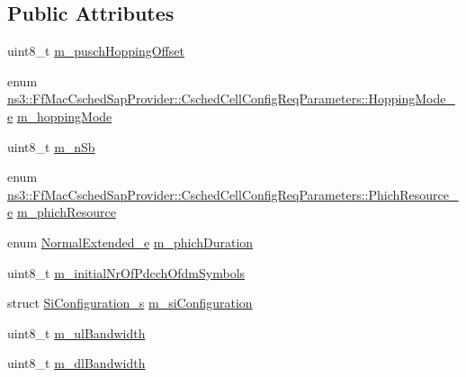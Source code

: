 \subsection*{Public Attributes}
\begin{DoxyCompactItemize}
\item 
uint8\+\_\+t \hyperlink{structns3_1_1FfMacCschedSapProvider_1_1CschedCellConfigReqParameters_a9b2039417a2acae24f34443d4ccca623}{m\+\_\+pusch\+Hopping\+Offset}
\item 
enum \hyperlink{structns3_1_1FfMacCschedSapProvider_1_1CschedCellConfigReqParameters_a3a253470bbd8ba28e90cf09b6c382520}{ns3\+::\+Ff\+Mac\+Csched\+Sap\+Provider\+::\+Csched\+Cell\+Config\+Req\+Parameters\+::\+Hopping\+Mode\+\_\+e} \hyperlink{structns3_1_1FfMacCschedSapProvider_1_1CschedCellConfigReqParameters_aad101ab154fed558ad95118b238e312c}{m\+\_\+hopping\+Mode}
\item 
uint8\+\_\+t \hyperlink{structns3_1_1FfMacCschedSapProvider_1_1CschedCellConfigReqParameters_a16af2376a1c1baf75c592a30825e28ec}{m\+\_\+n\+Sb}
\item 
enum \hyperlink{structns3_1_1FfMacCschedSapProvider_1_1CschedCellConfigReqParameters_aef8254d6930454e2d49dfa0e1879ad15}{ns3\+::\+Ff\+Mac\+Csched\+Sap\+Provider\+::\+Csched\+Cell\+Config\+Req\+Parameters\+::\+Phich\+Resource\+\_\+e} \hyperlink{structns3_1_1FfMacCschedSapProvider_1_1CschedCellConfigReqParameters_a1015f9371e627f115731d3960b9489e7}{m\+\_\+phich\+Resource}
\item 
enum \hyperlink{namespacens3_acf4e55ff5777ad2ac5ce429a45c38506}{Normal\+Extended\+\_\+e} \hyperlink{structns3_1_1FfMacCschedSapProvider_1_1CschedCellConfigReqParameters_a931b03b00934d8456e802b4ec66a8f0c}{m\+\_\+phich\+Duration}
\item 
uint8\+\_\+t \hyperlink{structns3_1_1FfMacCschedSapProvider_1_1CschedCellConfigReqParameters_a0b17ed9819253349dc77af95f27e12df}{m\+\_\+initial\+Nr\+Of\+Pdcch\+Ofdm\+Symbols}
\item 
struct \hyperlink{structns3_1_1SiConfiguration__s}{Si\+Configuration\+\_\+s} \hyperlink{structns3_1_1FfMacCschedSapProvider_1_1CschedCellConfigReqParameters_aced314d1d5aaba2ae2e8d46385dbb543}{m\+\_\+si\+Configuration}
\item 
uint8\+\_\+t \hyperlink{structns3_1_1FfMacCschedSapProvider_1_1CschedCellConfigReqParameters_a5ab5b102878e6e7e7727a14af4a64d2f}{m\+\_\+ul\+Bandwidth}
\item 
uint8\+\_\+t \hyperlink{structns3_1_1FfMacCschedSapProvider_1_1CschedCellConfigReqParameters_ad18c695bd3c9d7f742ba1dab4a941e8a}{m\+\_\+dl\+Bandwidth}

\end{DoxyCompactItemize}
